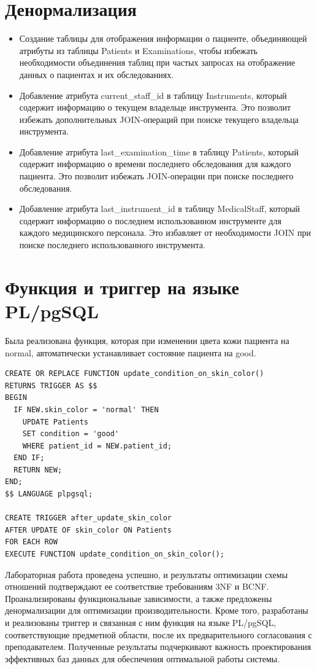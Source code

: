 \documentclass[14pt]{extreport}
\begin{document}
    \chapter{Денормализация}
    \begin{itemize}
        \item Создание таблицы для отображения информации о пациенте, объединяющей атрибуты из таблицы Patients и Examinations, чтобы избежать необходимости объединения таблиц при частых запросах на отображение данных о пациентах и их обследованиях.
        \item Добавление атрибута current\_staff\_id в таблицу Instruments, который содержит информацию о текущем владельце инструмента. Это позволит избежать дополнительных JOIN-операций при поиске текущего владельца инструмента.
        \item Добавление атрибута last\_examination\_time в таблицу Patients, который содержит информацию о времени последнего обследования для каждого пациента. Это позволит избежать JOIN-операции при поиске последнего обследования.
        \item Добавление атрибута last\_instrument\_id в таблицу MedicalStaff, который содержит информацию о последнем использованном инструменте для каждого медицинского персонала. Это избавляет от необходимости JOIN при поиске последнего использованного инструмента.
    \end{itemize}

    \chapter{Функция и триггер на языке PL/pgSQL}
    Была реализована функция, которая при изменении цвета кожи пациента на normal, автоматически устанавливает состояние пациента на good.

        \begin{verbatim}
CREATE OR REPLACE FUNCTION update_condition_on_skin_color()
RETURNS TRIGGER AS $$
BEGIN
  IF NEW.skin_color = 'normal' THEN
    UPDATE Patients
    SET condition = 'good'
    WHERE patient_id = NEW.patient_id;
  END IF;
  RETURN NEW;
END;
$$ LANGUAGE plpgsql;

CREATE TRIGGER after_update_skin_color
AFTER UPDATE OF skin_color ON Patients
FOR EACH ROW
EXECUTE FUNCTION update_condition_on_skin_color();

            \end{verbatim}
    \conclusions Лабораторная работа проведена успешно, и результаты оптимизации схемы отношений подтверждают ее соответствие требованиям 3NF и BCNF. Проанализированы функциональные зависимости, а также предложены денормализации для оптимизации производительности. Кроме того, разработаны и реализованы триггер и связанная с ним функция на языке PL/pgSQL, соответствующие предметной области, после их предварительного согласования с преподавателем. Полученные результаты подчеркивают важность проектирования эффективных баз данных для обеспечения оптимальной работы системы.
\end{document}
